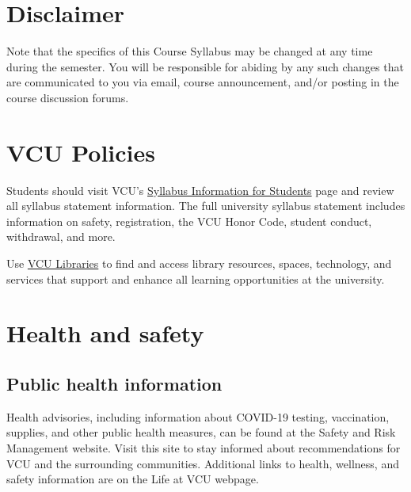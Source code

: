 \documentclass[
  letterpaper,
]{book}
\begin{document}
\section*{Disclaimer}\label{disclaimer}


Note that the specifics of this Course Syllabus may be changed at any
time during the semester. You will be responsible for abiding by any
such changes that are communicated to you via email, course
announcement, and/or posting in the course discussion forums.

\section*{VCU Policies}\label{vcu-policies}


Students should visit VCU's \href{http://go.vcu.edu/syllabus}{Syllabus
Information for Students} page and review all syllabus statement
information. The full university syllabus statement includes information
on safety, registration, the VCU Honor Code, student conduct,
withdrawal, and more.

Use \href{https://www.library.vcu.edu}{VCU Libraries} to find and access
library resources, spaces, technology, and services that support and
enhance all learning opportunities at the university.

\section*{Health and safety}\label{health-and-safety}


\subsection*{Public health information}\label{public-health-information}

Health advisories, including information about COVID-19 testing,
vaccination, supplies, and other public health measures, can be found at
the Safety and Risk Management website. Visit this site to stay informed
about recommendations for VCU and the surrounding communities.
Additional links to health, wellness, and safety information are on the
Life at VCU webpage.
\end{document}
